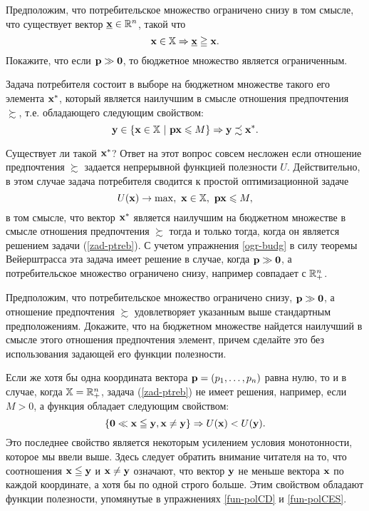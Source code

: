 \begin{exer}
\label{ogr-budg}
    Предположим, что потребительское множество ограничено снизу в
    том смысле, что существует вектор
    $\mathbf{\underline{x}}\in\mathbb{R}^{n}$, такой что
    \[\mathbf{x}\in\mathbb{X}\Rightarrow \mathbf{\underline{x}}\geqq\mathbf{x}.\]
    Покажите, что если $\mathbf{p}\gg\mathbf{0}$, то бюджетное множество
    является ограниченным.
\end{exer}

    Задача потребителя состоит в выборе на бюджетном
    множестве такого его элемента $\mathbf{x^{*}}$, который является
    наилучшим в смысле отношения
    предпочтения $\succsim$, т.е. обладающего следующим свойством:
    \[\vc{y}\in\{\vc{x}\in\st{X} \ | \ \vc{p}\vc{x}\leqslant M\}\Rightarrow\vc{y}\precsim\vc{x^{*}}.\]

    Существует ли такой $\mathbf{x^{*}}$? Ответ на этот вопрос совсем
    несложен если отношение предпочтения $\succsim$
    задается непрерывной функцией полезности $U$. Действительно, в
    этом случае задача
    потребителя сводится к простой оптимизационной задаче
\begin{equation}
\label{zad-ptreb}
    U(\vc{x})\rightarrow\max, \ \vc{x}\in\st{X},  \ \vc{p}\vc{x}\leqslant M,
\end{equation}
    в том смысле, что вектор $\mathbf{x^{*}}$ является наилучшим на бюджетном
    множестве в смысле отношения предпочтения $\succsim$ тогда и
    только тогда, когда он является решением задачи
    (\ref{zad-ptreb}).
    С учетом упражнения \ref{ogr-budg} в силу теоремы Вейерштрасса эта задача имеет
    решение в случае, когда $\mathbf{p}\gg\mathbf{0}$, а потребительское множество ограничено
    снизу, например совпадает с $\mathbb{R}^{n}_{+}$.

\begin{exer}
    Предположим, что потребительское множество ограничено снизу,
    $\mathbf{p}\gg\mathbf{0}$,  а отношение предпочтения $\succsim$
     удовлетворяет указанным выше стандартным предположениям.
     Докажите, что на бюджетном множестве найдется наилучший в
     смысле этого отношения предпочтения элемент, причем сделайте
     это без использования задающей его функции полезности.
\end{exer}




    Если же хотя бы одна
    координата вектора $\mathbf{p}=(p_{1},\ldots,p_{n})$ равна нулю, то
    и в случае, когда $\mathbb{X}=\mathbb{R}^{n}_{+}$, задача (\ref{zad-ptreb})
    не имеет решения, например, если $M>0$, а функция обладает следующим
    свойством:
    \[\{\mathbf{0}\ll\mathbf{x}\leqq\mathbf{y}, \mathbf{x}\neq\mathbf{y}\}\Rightarrow U(\mathbf{x})<U(\mathbf{y}).\]
    Это последнее свойство является некоторым усилением условия
    монотонности, которое мы ввели выше. Здесь следует обратить внимание
    читателя на то, что
    соотношения $\mathbf{x}\leqq\mathbf{y}$ и $\mathbf{x}\neq\mathbf{y}$
    означают, что вектор $\mathbf{y}$ не меньше вектора $\mathbf{x}$ по
    каждой координате, а хотя бы по одной строго больше. Этим
    свойством обладают функции полезности, упомянутые в упражнениях
    \ref{fun-polCD} и \ref{fun-polCES}.

